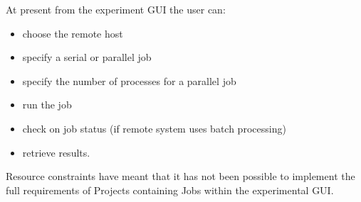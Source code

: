 At present from the experiment GUI the user can:

\begin{itemize}
\item choose the remote host
\item specify a serial or parallel job
\item specify the number of processes for a parallel job
\item run the job
\item check on job status (if remote system uses batch processing)
\item retrieve results.
\end{itemize}

Resource constraints have meant that it has not been possible to implement the full requirements of Projects containing Jobs within the experimental GUI.

